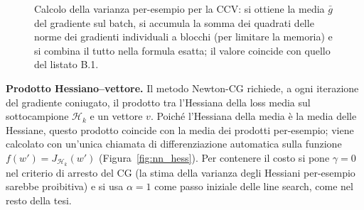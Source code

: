 \documentclass[italian, a4paper, twoside, binding=6mm]{sapthesis}
\begin{document}
\begin{figure}[H]
\centering
{}
\caption{Calcolo della varianza per-esempio per la CCV: si ottiene la media
$\bar g$ del gradiente sul batch, si accumula la somma dei quadrati delle norme
dei gradienti individuali a blocchi (per limitare la memoria) e si combina il
tutto nella formula esatta; il valore coincide con quello del listato B.1.}
\label{fig:nn_ccv}
\end{figure}

\textbf{Prodotto Hessiano--vettore.} Il metodo Newton-CG richiede, a ogni
iterazione del gradiente coniugato, il prodotto tra l'Hessiana della loss media
sul sottocampione $\mathcal{H}_k$ e un vettore $v$. Poiché l'Hessiana della
media è la media delle Hessiane, questo prodotto coincide con la media dei
prodotti per-esempio; viene calcolato con un'unica chiamata di
differenziazione automatica sulla funzione $f(w') = J_{\mathcal{H}_k}(w')$
(Figura~\ref{fig:nn_hess}). Per contenere il costo si pone $\gamma = 0$ nel
criterio di arresto del CG (la stima della varianza degli Hessiani per-esempio
sarebbe proibitiva) e si usa $\alpha = 1$ come passo iniziale delle line
search, come nel resto della tesi.
\end{document}
